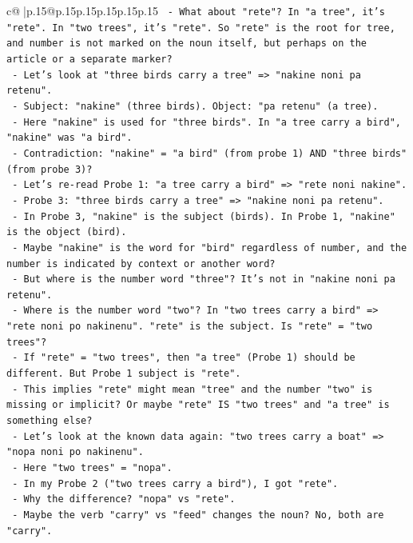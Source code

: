 \documentclass{article}
\begin{document}
{\begin{supertabular}{c@{$\;$}|p{.15\linewidth}@{}p{.15\linewidth}p{.15\linewidth}p{.15\linewidth}p{.15\linewidth}p{.15\linewidth}}
{{{\texttt{   {-} What about "rete"? In "a tree", it's "rete". In "two trees", it's "rete". So "rete" is the root for tree, and number is not marked on the noun itself, but perhaps on the article or a separate marker?} \\
\texttt{   {-} Let's look at "three birds carry a tree" => "nakine noni pa retenu".} \\
\texttt{   {-} Subject: "nakine" (three birds). Object: "pa retenu" (a tree).} \\
\texttt{   {-} Here "nakine" is used for "three birds". In "a tree carry a bird", "nakine" was "a bird".} \\
\texttt{   {-} Contradiction: "nakine" = "a bird" (from probe 1) AND "three birds" (from probe 3)?} \\
\texttt{   {-} Let's re{-}read Probe 1: "a tree carry a bird" => "rete noni nakine".} \\
\texttt{   {-} Probe 3: "three birds carry a tree" => "nakine noni pa retenu".} \\
\texttt{   {-} In Probe 3, "nakine" is the subject (birds). In Probe 1, "nakine" is the object (bird).} \\
\texttt{   {-} Maybe "nakine" is the word for "bird" regardless of number, and the number is indicated by context or another word?} \\
\texttt{   {-} But where is the number word "three"? It's not in "nakine noni pa retenu".} \\
\texttt{   {-} Where is the number word "two"? In "two trees carry a bird" => "rete noni po nakinenu". "rete" is the subject. Is "rete" = "two trees"?} \\
\texttt{   {-} If "rete" = "two trees", then "a tree" (Probe 1) should be different. But Probe 1 subject is "rete".} \\
\texttt{   {-} This implies "rete" might mean "tree" and the number "two" is missing or implicit? Or maybe "rete" IS "two trees" and "a tree" is something else?} \\
\texttt{   {-} Let's look at the known data again: "two trees carry a boat" => "nopa noni po nakinenu".} \\
\texttt{   {-} Here "two trees" = "nopa".} \\
\texttt{   {-} In my Probe 2 ("two trees carry a bird"), I got "rete".} \\
\texttt{   {-} Why the difference? "nopa" vs "rete".} \\
\texttt{   {-} Maybe the verb "carry" vs "feed" changes the noun? No, both are "carry".} \\
}}}
\end{supertabular}}
\end{document}
